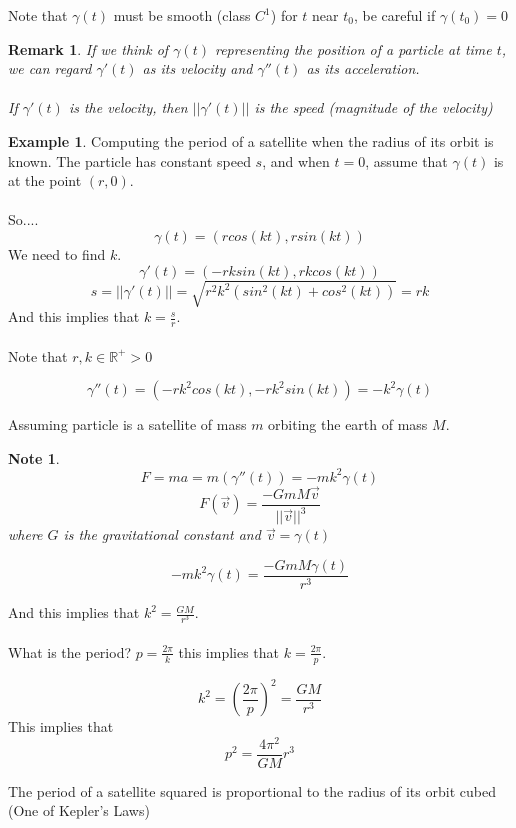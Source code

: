 \documentclass[12pt]{article}
\theoremstyle{plain}
\newtheorem*{remark}{Remark}
\newtheorem*{note}{Note}
\theoremstyle{definition}
\newtheorem{example}[theorem]{Example}
\begin{document}
Note that $\gamma (t)$ must be smooth (class $C^1$) for $t$ near $t_0$, be careful if $\gamma (t_0) = 0$

\begin{remark}
	If we think of $\gamma (t)$ representing the position of a particle at time $t$, we can regard $\gamma ' (t)$ as its velocity and $\gamma '' (t)$ as its acceleration.\\
	\\
	If $\gamma ' (t)$ is the velocity, then $||\gamma ' (t)||$ is the speed (magnitude of the velocity)
\end{remark}

\begin{example}
	Computing the period of a satellite when the radius of its orbit is known. The particle has constant speed $s$, and when $t=0$, assume that $\gamma (t)$ is at the point $(r,0)$.\\
	\\
	So....
	$$\gamma(t) = (rcos(kt), rsin(kt))$$
	We need to find $k$.
	$$\gamma ' (t) = (-rksin(kt), rkcos(kt))$$
	$$s = ||\gamma ' (t)|| = \sqrt{r^2 k^2 (sin^2 (kt) + cos^2 (kt))} = rk$$
	And this implies that $k = \frac{s}{r}$.\\
	\\
	Note that $r,k \in \mathbb{R}^+ > 0$

	$$\gamma '' (t) = (-rk^2 cos(kt), -rk^2 sin(kt)) = -k^2 \gamma (t)$$

	Assuming particle is a satellite of mass $m$ orbiting the earth of mass $M$.

	\begin{note}
		$$F = ma = m(\gamma '' (t)) = -mk^2 \gamma (t)$$
		$$F(\vec{v}) = \frac{-G m M \vec{v}}{||\vec{v}||^3}$$
		where $G$ is the gravitational constant and $\vec{v} = \gamma (t)$
	\end{note}

	$$-mk^2 \gamma (t) = \frac{-G m M \gamma (t)}{r^3}$$

	And this implies that $k^2 = \frac{GM}{r^3}$.\\
	\\
	What is the period? $p = \frac{2\pi}{k}$ this implies that $k = \frac{2\pi}{p}$.

	$$k^2 = (\frac{2\pi}{p})^2 = \frac{GM}{r^3}$$
	This implies that
	$$p^2 = \frac{4 \pi^2}{GM} r^3$$

	The period of a satellite squared is proportional to the radius of its orbit cubed (One of Kepler's Laws)

\end{example}
\end{document}
